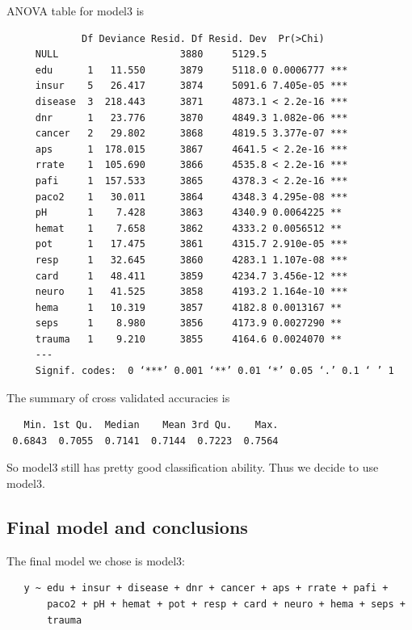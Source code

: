 \documentclass{article}
\begin{document}
\newpage
ANOVA table for model3 is
\begin{verbatim}
             Df Deviance Resid. Df Resid. Dev  Pr(>Chi)    
     NULL                     3880     5129.5              
     edu      1   11.550      3879     5118.0 0.0006777 ***
     insur    5   26.417      3874     5091.6 7.405e-05 ***
     disease  3  218.443      3871     4873.1 < 2.2e-16 ***
     dnr      1   23.776      3870     4849.3 1.082e-06 ***
     cancer   2   29.802      3868     4819.5 3.377e-07 ***
     aps      1  178.015      3867     4641.5 < 2.2e-16 ***
     rrate    1  105.690      3866     4535.8 < 2.2e-16 ***
     pafi     1  157.533      3865     4378.3 < 2.2e-16 ***
     paco2    1   30.011      3864     4348.3 4.295e-08 ***
     pH       1    7.428      3863     4340.9 0.0064225 ** 
     hemat    1    7.658      3862     4333.2 0.0056512 ** 
     pot      1   17.475      3861     4315.7 2.910e-05 ***
     resp     1   32.645      3860     4283.1 1.107e-08 ***
     card     1   48.411      3859     4234.7 3.456e-12 ***
     neuro    1   41.525      3858     4193.2 1.164e-10 ***
     hema     1   10.319      3857     4182.8 0.0013167 ** 
     seps     1    8.980      3856     4173.9 0.0027290 ** 
     trauma   1    9.210      3855     4164.6 0.0024070 ** 
     ---
     Signif. codes:  0 ‘***’ 0.001 ‘**’ 0.01 ‘*’ 0.05 ‘.’ 0.1 ‘ ’ 1
\end{verbatim}

The summary of cross validated accuracies is
\begin{verbatim}
   Min. 1st Qu.  Median    Mean 3rd Qu.    Max. 
 0.6843  0.7055  0.7141  0.7144  0.7223  0.7564 
\end{verbatim}

So model3 still has pretty good classification ability. Thus we decide to use model3.

\subsection{Final model and conclusions}
The final model we chose is model3:
\begin{verbatim}
   y ~ edu + insur + disease + dnr + cancer + aps + rrate + pafi + 
       paco2 + pH + hemat + pot + resp + card + neuro + hema + seps + 
       trauma
\end{verbatim}
\end{document}
